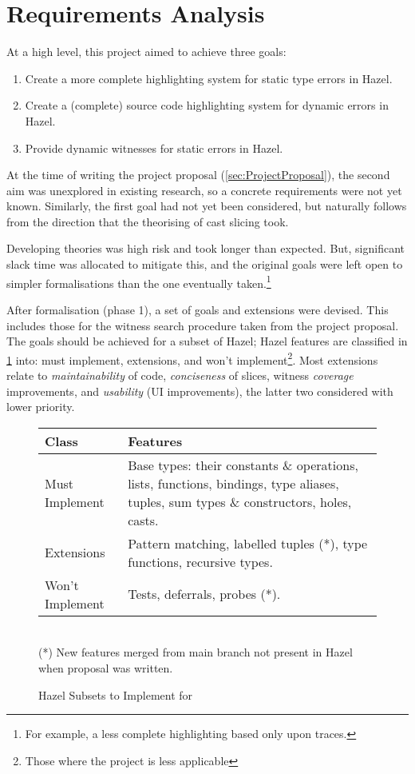\section{Requirements Analysis}\label{sec:RequirementAnalysis}
At a high level, this project aimed to achieve three goals:
\begin{enumerate}
\item Create a more complete highlighting system for static type errors in Hazel.
\item Create a (complete) source code highlighting system for dynamic errors in Hazel.
\item Provide dynamic witnesses for static errors in Hazel. 
\end{enumerate}
At the time of writing the project proposal (\cref{sec:ProjectProposal}), the second aim was unexplored in existing research, so a concrete requirements were not yet known. Similarly, the first goal had not yet been considered, but naturally follows from the direction that the theorising of cast slicing took.

Developing theories was high risk and took longer than expected. But, significant slack time was allocated to mitigate this, and the original goals were left open to simpler formalisations than the one eventually taken.\footnote{For example, a less complete highlighting based only upon traces.}

After formalisation (phase 1), a set of goals and extensions were devised. This includes those for the witness search procedure taken from the project proposal. The goals should be achieved for a subset of Hazel; Hazel features are classified in \cref{fig:Classes} into: must implement, extensions, and won't implement\footnote{Those where the project is less applicable}. Most extensions relate to \textit{maintainability} of code, \textit{conciseness} of slices, witness \textit{coverage} improvements, and \textit{usability} (UI improvements), the latter two considered with lower priority.

\begin{figure}[h]
\begin{tabular}{lp{12cm}}
Class & Features\\
\hline
{\color{red}Must Implement} & {Base types: their constants \& operations, lists, functions, bindings, type aliases, tuples, sum types \& constructors, holes, casts.}\\
{\color{orange}Extensions} & Pattern matching, labelled tuples (*), type functions, recursive types.\\
{\color{blue}Won't Implement} & Tests, deferrals, probes (*).\\
\end{tabular}
\ \\

(*) New features merged from main branch not present in Hazel when proposal was written. 
\caption{Hazel Subsets to Implement for}
\label{fig:Classes}
\end{figure}

